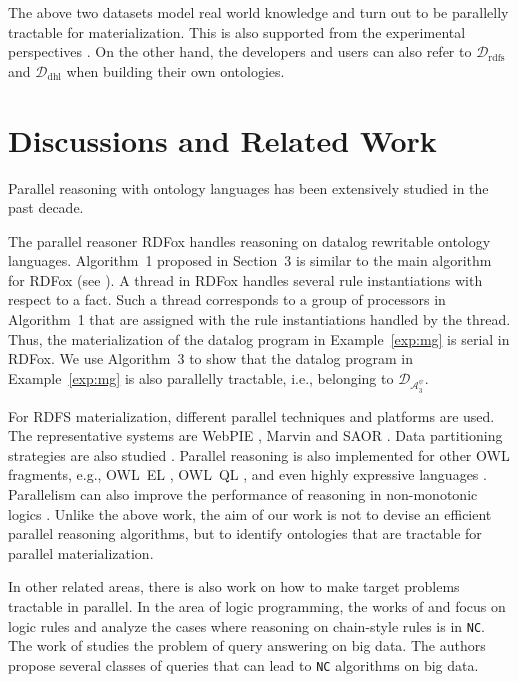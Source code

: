 \documentclass{article}
\begin{document}
The above two datasets model real world knowledge and turn out to be parallelly tractable for materialization.
This is also supported from the experimental perspectives \cite{DBLP:journals/ws/UrbaniKMHB12,DBLP:conf/icde/SundaraAKDWCS10}.
On the other hand, the developers and users can also
refer to $\mathcal{D}_{\text{rdfs}}$ and $\mathcal{D}_{\text{dhl}}$ when building their own ontologies.

\section{Discussions and Related Work}

Parallel reasoning with ontology languages has been extensively studied in the past decade.

The parallel reasoner RDFox \cite{DBLP:conf/aaai/MotikNPHO14} handles reasoning on datalog rewritable ontology languages.
Algorithm~1 proposed in Section~3 is similar to the main algorithm for RDFox (see \cite[Sections~3 and~4]{DBLP:conf/aaai/MotikNPHO14}). A thread in RDFox handles several rule instantiations with respect to a fact. Such a thread corresponds to a group of processors in Algorithm~1 that are assigned with the rule instantiations handled by the thread. Thus, the materialization of the datalog program in Example~\ref{exp:mg} is serial in RDFox. We use Algorithm~3 to show that the datalog program in Example~\ref{exp:mg} is also parallelly tractable, i.e., belonging to $\mathcal{D}_{\mathcal{A}_3^{\psi}}$.

For RDFS materialization, different parallel techniques and platforms are used. The representative systems are WebPIE \cite{DBLP:journals/ws/UrbaniKMHB12}, Marvin \cite{oren2009marvin} and SAOR \cite{DBLP:journals/ijswis/HoganHP09}.
Data partitioning strategies are also studied \cite{DBLP:conf/ISCApdcs/SomaP08,DBLP:conf/semweb/WeaverH09}. Parallel reasoning is also implemented for other OWL fragments, e.g., OWL~EL \cite{DBLP:journals/jar/KazakovKS14}, OWL~QL \cite{DBLP:conf/dlog/LemboSS13}, and even highly expressive languages \cite{StLG14b,DBLP:conf/otm/LiebigM07,DBLP:conf/dlog/SchlichtS08,DBLP:conf/dlog/WuH12}. Parallelism can also improve the performance of reasoning in non-monotonic logics \cite{Tachmazidis-Stratified-ECAI2012}.
Unlike the above work, the aim of our work is not to devise an efficient parallel reasoning algorithms, but to identify ontologies
that are tractable for parallel materialization.

In other related areas, there is also work on how to make target problems tractable in parallel. In the area of logic programming, the works of \citeauthor{DBLP:journals/algorithmica/UllmanG88}  and \citeauthor{DBLP:journals/jacm/AfratiP93}  focus on logic rules and analyze the cases where reasoning on chain-style rules is in \texttt{NC}. The work of \citeauthor{DBLP:journals/jcst/FanH14}  studies the problem of query answering on big data. The authors propose several classes of queries that can lead to \texttt{NC} algorithms on big data.
\end{document}

